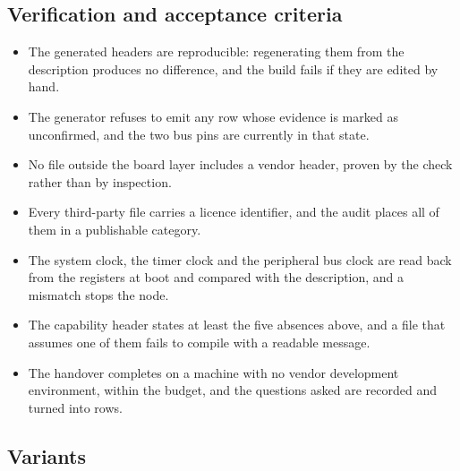 \subsection*{Verification and acceptance criteria}

\begin{itemize}
\item The generated headers are reproducible: regenerating them from the
description produces no difference, and the build fails if they are edited by
hand.
\item The generator refuses to emit any row whose evidence is marked as
unconfirmed, and the two bus pins are currently in that state.
\item No file outside the board layer includes a vendor header, proven by the
check rather than by inspection.
\item Every third-party file carries a licence identifier, and the audit places
all of them in a publishable category.
\item The system clock, the timer clock and the peripheral bus clock are read
back from the registers at boot and compared with the description, and a
mismatch stops the node.
\item The capability header states at least the five absences above, and a file
that assumes one of them fails to compile with a readable message.
\item The handover completes on a machine with no vendor development
environment, within the budget, and the questions asked are recorded and turned
into rows.
\end{itemize}

\subsection*{Variants}

